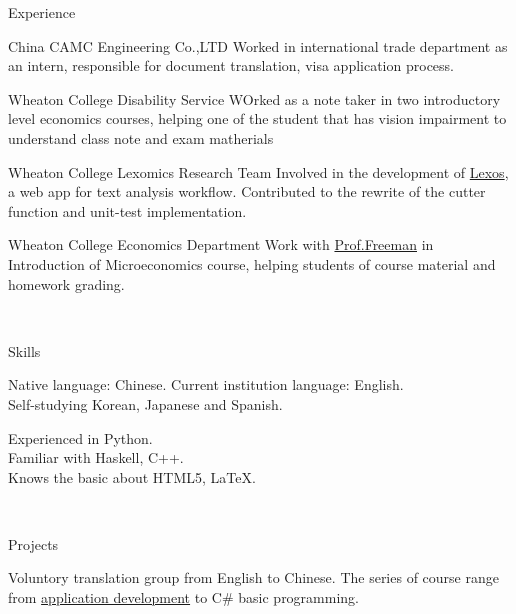 \documentclass[]{resume-knyte}
\begin{document}
\begin{topic}{Experience}


    {China CAMC Engineering Co.,LTD}
    {Worked in international trade department as an intern, responsible for document translation, visa application process.}

    {Wheaton College Disability Service}
    {WOrked as a note taker in two introductory level economics courses, 
    helping one of the student that has vision impairment to understand class note and exam matherials}

    {Wheaton College Lexomics Research Team}
    {Involved in the development of \href{https://github.com/WheatonCS/Lexos}{Lexos}, a web app for text analysis workflow.
    Contributed to the rewrite of the cutter function and unit-test implementation.}


    {Wheaton College Economics Department}
    {Work with \href{https://wheatoncollege.edu/academics/faculty-directory/james-freeman/}{Prof.Freeman}
    in Introduction of Microeconomics course, helping students of course material and homework grading.}

\\ %
\end{topic}


\begin{topic}{Skills}

    {Native language: Chinese. Current institution language: English. \\
    Self-studying Korean, Japanese and Spanish.
    }

    {Experienced in Python.\\
    Familiar with Haskell, C++.\\
    Knows the basic about HTML5, \LaTeX{}.}

    \\ %
\end{topic}

\begin{topic}{Projects}


    {Voluntory translation group from English to Chinese.}
    {The series of course range from \href{https://github.com/chantisnake/AbsoluteBeginnersWin10}{application development} to C\# basic programming.}

\end{topic}
\end{document}
